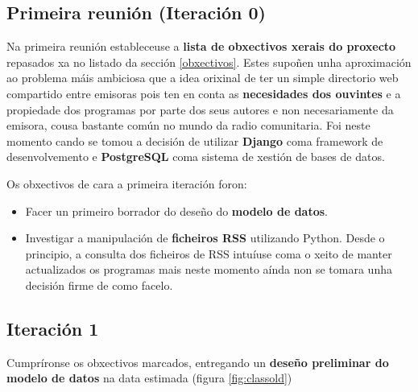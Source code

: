 \subsection{Primeira reunión (Iteración 0)}
\label{it0}

Na primeira reunión estableceuse a \textbf{lista de obxectivos xerais do proxecto} repasados xa no listado da sección \ref{obxectivos}. Estes supoñen unha aproximación ao problema máis ambiciosa que a idea orixinal de ter un simple directorio web compartido entre emisoras pois ten en conta as \textbf{necesidades dos ouvintes} e a propiedade dos programas por parte dos seus autores e non necesariamente da emisora, cousa bastante común no mundo da radio comunitaria. Foi neste momento cando se tomou a decisión de utilizar \textbf{Django} coma framework de desenvolvemento e \textbf{PostgreSQL} coma sistema de xestión de bases de datos.

Os obxectivos de cara a primeira iteración foron:

\begin{itemize}
	\item Facer un primeiro borrador do deseño do \textbf{modelo de datos}.
	\item Investigar a manipulación de \textbf{ficheiros RSS} utilizando Python. Desde o principio, a consulta dos ficheiros de RSS intuíuse coma o xeito de manter actualizados os programas mais neste momento aínda non se tomara unha decisión firme de como facelo.
\end{itemize}

\subsection{Iteración 1}

Cumpríronse os obxectivos marcados, entregando un \textbf{deseño preliminar do modelo de datos} na data estimada (figura \ref{fig:classold}) 

